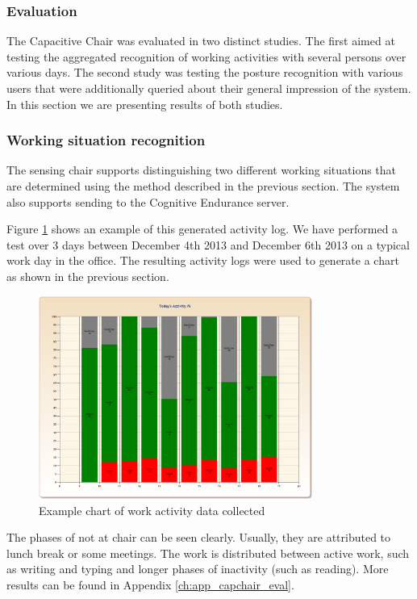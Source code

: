 \subsubsection{Evaluation}
The Capacitive Chair was evaluated in two distinct studies. The first aimed at testing the aggregated recognition of working activities with several persons over various days. The second study was testing the posture recognition with various users that were additionally queried about their general impression of the system. In this section we are presenting results of both studies.

\subsubsection*{Working situation recognition}
The sensing chair supports distinguishing two different working situations that are determined using the method described in the previous section. The system also supports sending to the Cognitive Endurance server.
 
Figure \ref{fig:prot_capchair_eval_work} shows an example of this generated activity log. We have performed a test over 3 days between December 4th 2013 and December 6th 2013 on a typical work day in the office. The resulting activity logs were used to generate a chart as shown in the previous section. 

\begin{figure}[ht]
\centering
\includegraphics[width=0.8\textwidth]{images/prot_capchair_eval_work}
\caption{Example chart of work activity data collected}
\label{fig:prot_capchair_eval_work}
\end{figure}	

The phases of not at chair can be seen clearly. Usually, they are attributed to lunch break or some meetings. The work is distributed between active work, such as writing and typing and longer phases of inactivity (such as reading). More results can be found in Appendix \ref{ch:app_capchair_eval}.

